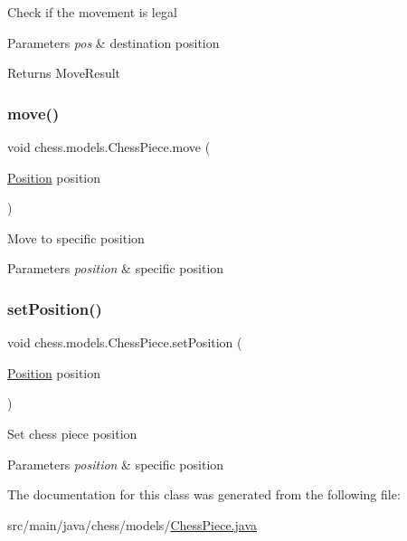 Check if the movement is legal


\begin{DoxyParams}{Parameters}
{\em pos} & destination position \\
\hline
\end{DoxyParams}
\begin{DoxyReturn}{Returns}
Move\+Result 
\end{DoxyReturn}
\mbox{\label{classchess_1_1models_1_1_chess_piece_a77865fbd52257338c4e376af525155c7}} 
\subsubsection{\texorpdfstring{move()}{move()}}
{\footnotesize\ttfamily void chess.\+models.\+Chess\+Piece.\+move (\begin{DoxyParamCaption}\item[{\mbox{\hyperlink{classchess_1_1models_1_1_position}{Position}}}]{position }\end{DoxyParamCaption})}

Move to specific position


\begin{DoxyParams}{Parameters}
{\em position} & specific position \\
\hline
\end{DoxyParams}
\mbox{\label{classchess_1_1models_1_1_chess_piece_a2e3c62bde5041ca0aa53e0476cc8b600}} 
\subsubsection{\texorpdfstring{set\+Position()}{setPosition()}}
{\footnotesize\ttfamily void chess.\+models.\+Chess\+Piece.\+set\+Position (\begin{DoxyParamCaption}\item[{\mbox{\hyperlink{classchess_1_1models_1_1_position}{Position}}}]{position }\end{DoxyParamCaption})}

Set chess piece position


\begin{DoxyParams}{Parameters}
{\em position} & specific position \\
\hline
\end{DoxyParams}


The documentation for this class was generated from the following file\+:\begin{DoxyCompactItemize}
\item 
src/main/java/chess/models/\mbox{\hyperlink{_chess_piece_8java}{Chess\+Piece.\+java}}\end{DoxyCompactItemize}
